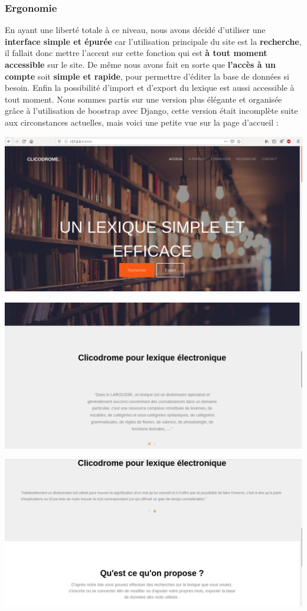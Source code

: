 \documentclass[a4paper, 12pt]{article}
\begin{document}
\subsubsection{Ergonomie}
En ayant une liberté totale à ce niveau, nous avons décidé d'utiliser une \textbf{interface simple et épurée} car l'utilisation principale du site est la \textbf{recherche}, il fallait donc mettre l'accent sur cette fonction qui est \textbf{à tout moment accessible} sur le site. De même nous avons fait en sorte que \textbf{l'accès à un compte} soit \textbf{simple et rapide}, pour permettre d'éditer la base de données si besoin. Enfin la possibilité d'import et d'export du lexique est  aussi accessible à tout moment.
Nous sommes partis sur une version plus élégante et organisée grâce à l'utilisation de boostrap avec Django, cette version était incomplète suite aux circonstances actuelles, mais voici une petite vue sur la page d'accueil :
\\

\centerline{\includegraphics[scale=0.4]{1.png}}
    
\centerline{\includegraphics[scale=0.4]{2.png}}
    
\centerline{\includegraphics[scale=0.4]{3.png}}
\end{document}
